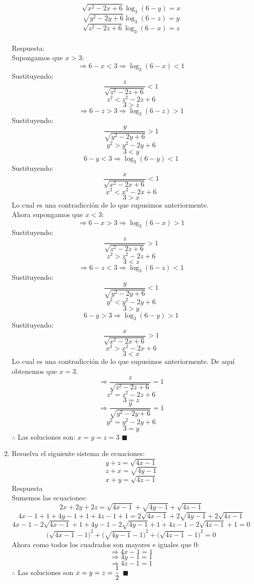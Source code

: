 \documentclass{book}
\begin{document}
\begin{enumerate}
        $$\sqrt{x^2-2x+6}\log_{3}{(6-y)}=x$$
        $$\sqrt{y^2-2y+6}\log_{3}{(6-z)}=y$$
        $$\sqrt{z^2-2z+6}\log_{3}{(6-x)}=z$$\\
        Respuesta:\\
        Supongamos que $x>3$:
        $$\Rightarrow 6-x<3\Rightarrow \log_{3}(6-x)<1$$
        Sustituyendo:
        $$\frac{z}{\sqrt{z^2-2z+6}}<1$$
        $$z^2<z^2-2z+6$$
        $$3>z$$
        $$\Rightarrow 6-z>3\Rightarrow \log_{3}(6-z)>1$$
        Sustituyendo:
        $$\frac{y}{\sqrt{y^2-2y+6}}>1$$
        $$y^2>y^2-2y+6$$
        $$3<y$$
        $$6-y<3\Rightarrow\log_{3}(6-y)<1$$
        Sustituyendo:
        $$\frac{x}{\sqrt{x^2-2x+6}}<1$$
        $$x^2<x^2-2x+6$$
        $$3>x$$
        Lo cual es una contradicción de lo que supusimos anteriormente.\\
        Ahora supongamos que $x<3$:
        $$\Rightarrow 6-x>3\Rightarrow \log_{3}(6-x)>1$$
        Sustituyendo:
        $$\frac{z}{\sqrt{z^2-2z+6}}>1$$
        $$z^2>z^2-2z+6$$
        $$3<z$$
        $$\Rightarrow 6-z<3\Rightarrow \log_{3}(6-z)<1$$
        Sustituyendo:
        $$\frac{y}{\sqrt{y^2-2y+6}}<1$$
        $$y^2<y^2-2y+6$$
        $$3>y$$
        $$6-y>3\Rightarrow\log_{3}(6-y)>1$$
        Sustituyendo:
        $$\frac{x}{\sqrt{x^2-2x+6}}>1$$
        $$x^2>x^2-2x+6$$
        $$3<x$$
        Lo cual es una contradicción de lo que supusimos anteriormente. De aquí obtenemos que $x=3$.
        $$\Rightarrow\frac{z}{\sqrt{z^2-2z+6}}=1$$
        $$z^2=z^2-2z+6$$
        $$3=z$$
        $$\Rightarrow \frac{y}{\sqrt{y^2-2y+6}}=1$$
        $$y^2=y^2-2y+6$$
        $$3=y$$
        $\therefore$ Las soluciones son: $x=y=z=3$ $\blacksquare$\\
        \item Resuelva el siguiente sistema de ecuaciones:
        $$y+z=\sqrt{4x-1}$$
        $$z+x=\sqrt{4y-1}$$
        $$x+y=\sqrt{4z-1}$$
        Respuesta\\
        Sumemos las ecuaciones:
        $$2x+2y+2z=\sqrt{4x-1}+\sqrt{4y-1}+\sqrt{4z-1}$$
        $$4x-1+1+4y-1+1+4z-1+1=2\sqrt{4x-1}+2\sqrt{4y-1}+2\sqrt{4z-1}$$
        $$4x-1-2\sqrt{4x-1}+1+4y-1-2\sqrt{4y-1}+1+4z-1-2\sqrt{4z-1}+1=0$$
        $${\big(\sqrt{4x-1}-1\big)}^2+{\big(\sqrt{4y-1}-1\big)}^2+{\big(\sqrt{4z-1}-1\big)}^2=0$$
        Ahora como todos los cuadrados son mayores e iguales que 0:
        $$\Rightarrow 4x-1=1$$
        $$\Rightarrow 4y-1=1$$
        $$\Rightarrow 4z-1=1$$
        $\therefore$ Las soluciones son $\displaystyle{x=y=z={1\over 2}}$ $\blacksquare$\\

\end{enumerate}
\end{document}
